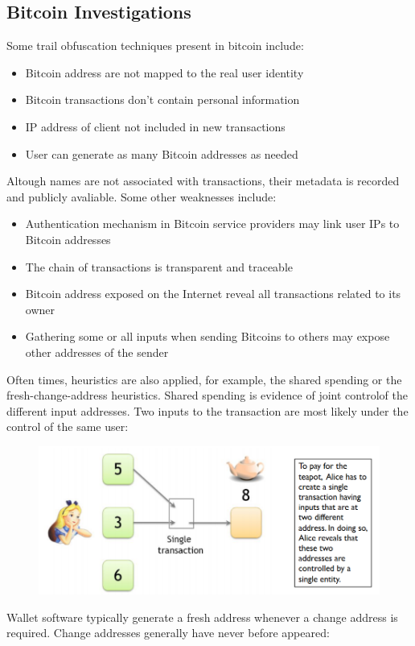 \documentclass[10pt,a4paper]{report}
\begin{document}
\subsection{Bitcoin Investigations}
Some trail obfuscation techniques present in bitcoin include:
\begin{itemize}
\item Bitcoin address are not mapped to the real user identity
\item Bitcoin transactions don’t contain personal information
\item IP address of client not included in new transactions
\item User can generate as many Bitcoin addresses as needed
\end{itemize}
Altough names are not associated with transactions, their metadata is recorded and publicly avaliable. Some other weaknesses include:
\begin{itemize}
\item Authentication mechanism in Bitcoin service providers may link user IPs to Bitcoin addresses
\item The chain of transactions is transparent and traceable
\item Bitcoin address exposed on the Internet reveal all transactions related to its owner
\item Gathering some or all inputs when sending Bitcoins to others may expose other addresses of the sender
\end{itemize}
Often times, heuristics are also applied, for example, the shared spending or the fresh-change-address heuristics. Shared spending is evidence of joint controlof the different input addresses. Two inputs to the transaction are most likely under the control of the same user:
\begin{figure}[H]
\centering
\includegraphics[scale=0.4]{32.png}
\end{figure}
Wallet software typically generate a fresh address whenever a change address is required. Change addresses generally have never before appeared:
\end{document}
